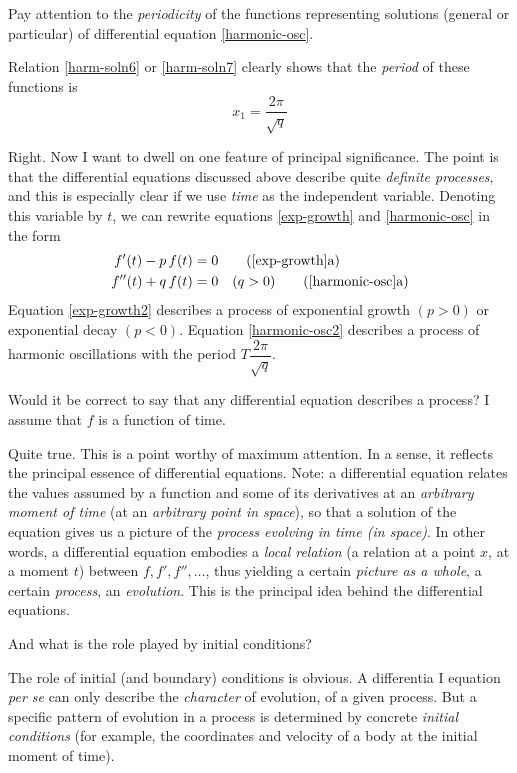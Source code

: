 Pay attention to the \emph{periodicity} of the functions representing solutions (general or particular) of differential equation \eqref{harmonic-osc}.

\rdr Relation \eqref{harm-soln6} or \eqref{harm-soln7} clearly shows that the \emph{period} of these functions is
\begin{equation}%
x_{1} = \dfrac{2 \pi}{\sqrt{q}}
\label{harm-soln7}
\end{equation}

\athr Right. Now I want to dwell on one feature of principal significance. The point is that the differential equations discussed above describe quite \emph{definite processes}, and this is especially clear if we use \emph{time} as the independent variable. Denoting this variable by $t$, we can rewrite equations \eqref{exp-growth} and \eqref{harmonic-osc} in the form
\begin{align*}%
f'(t) - p \, f(t) & = 0	
\tag{\ref{exp-growth}a}
\label{exp-growth2}\\
f''(t)  + q \, f(t) &= 0	\quad (q>0)
\tag{\ref{harmonic-osc}a}
\label{harmonic-osc2}
\end{align*}
Equation \eqref{exp-growth2} describes a process of exponential growth $(p > 0)$ or exponential decay $(p < 0)$. Equation \eqref{harmonic-osc2} describes a process of harmonic oscillations with the period
$T \dfrac{2 \pi}{\sqrt{q}}$.

\rdr Would it be correct to say that any differential equation describes a process? I assume that $f$ is a function of time.

\athr Quite true. This is a point worthy of maximum attention. In a sense, it reflects the principal essence of differential equations. Note: a differential equation relates the values assumed by a function and some of its derivatives at an \emph{arbitrary moment of time} (at an \emph{arbitrary point in space}), so that a solution of the equation gives us a picture of the \emph{process evolving in time (in space)}. In other words, a differential equation embodies a \emph{local relation} (a relation at a point $x$, at a moment $t$) between $f, f', f'', \ldots$, thus yielding a certain \emph{picture as a whole}, a certain \emph{process}, an \emph{evolution}. This is the principal idea behind the differential equations.

\rdr And what is the role played by initial conditions?

\athr The role of initial (and boundary) conditions is obvious. A differentia I equation \emph{per se} can only describe the \emph{character} of evolution, of a given process. But a specific pattern of evolution in a process is determined by concrete \emph{initial conditions} (for example, the coordinates and velocity of a body at the initial moment of time).

